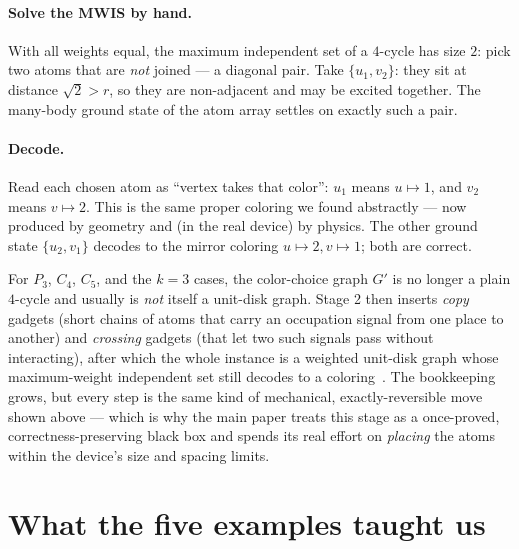 \documentclass[11pt]{article}
\begin{document}
\paragraph{Solve the MWIS by hand.} With all weights equal, the maximum
independent set of a $4$-cycle has size $2$: pick two atoms that are \emph{not}
joined --- a diagonal pair. Take $\{u_1,v_2\}$: they sit at distance
$\sqrt2 > r$, so they are non-adjacent and may be excited together. The
many-body ground state of the atom array settles on exactly such a pair.

\paragraph{Decode.} Read each chosen atom as ``vertex takes that color'': $u_1$
means $u\mapsto 1$, and $v_2$ means $v\mapsto 2$. This is the same proper coloring
we found abstractly --- now produced by geometry and (in the real device) by
physics. The other ground state $\{u_2,v_1\}$ decodes to the mirror coloring
$u\mapsto2, v\mapsto1$; both are correct.

\begin{tcolorbox}[colback=green!4,colframe=green!45!black,title=\textbf{What
  happens for the larger examples}]
For $P_3$, $C_4$, $C_5$, and the $k=3$ cases, the color-choice graph $G'$ is no
longer a plain $4$-cycle and usually is \emph{not} itself a unit-disk graph. Stage
2 then inserts \emph{copy} gadgets (short chains of atoms that carry an
occupation signal from one place to another) and \emph{crossing} gadgets (that let
two such signals pass without interacting), after which the whole instance is a
weighted unit-disk graph whose maximum-weight independent set still decodes to a
coloring~\cite{Pichler2018,Nguyen2023}. The bookkeeping grows, but every step is
the same kind of mechanical, exactly-reversible move shown above --- which is why
the main paper treats this stage as a once-proved, correctness-preserving black
box and spends its real effort on \emph{placing} the atoms within the device's
size and spacing limits.
\end{tcolorbox}

\section{What the five examples taught us}
\end{document}
